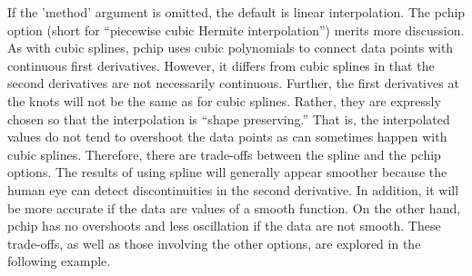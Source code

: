 \documentclass[../main.tex]{subfiles}
\begin{document}
If the 'method' argument is omitted, the default is linear interpolation.
The pchip option (short for “piecewise cubic Hermite interpolation”) merits more
discussion. As with cubic splines, pchip uses cubic polynomials to connect data points
with continuous first derivatives. However, it differs from cubic splines in that the second
derivatives are not necessarily continuous. Further, the first derivatives at the knots will not
be the same as for cubic splines. Rather, they are expressly chosen so that the interpolation
is “shape preserving.” That is, the interpolated values do not tend to overshoot the data
points as can sometimes happen with cubic splines.
Therefore, there are trade-offs between the spline and the pchip options. The results
of using spline will generally appear smoother because the human eye can detect discontinuities in the second derivative. In addition, it will be more accurate if the data are values of a smooth function. On the other hand, pchip has no overshoots and less oscillation
if the data are not smooth. These trade-offs, as well as those involving the other options, are
explored in the following example.
\end{document}
